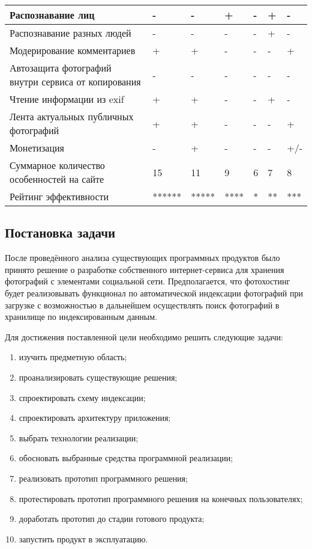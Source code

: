 \begin{landscape}
\begin{table}[H]
\begin{tabular}{|p{5.8cm}|p{2.8cm}|p{2.8cm}|p{2.8cm}|p{2.8cm}|p{2.8cm}|p{2.8cm}|}
  \hline Распознавание лиц & - & - & + & - & + & - \\ 
  \hline Распознавание разных людей & - & - & - & - & + & - \\ 
  \hline Модерирование комментариев & + & + & - & - & - & + \\ 
  \hline Автозащита фотографий внутри сервиса от копирования & - & - & - & - & - & - \\ 
  \hline Чтение информации из exif & + & + & - & - & + & - \\ 
  \hline Лента актуальных публичных фотографий & + & + & - & - & - & + \\ 
  \hline Монетизация & - & + & - & - & - & +/- \\ 
  \hline Суммарное количество особенностей на сайте & 15 & 11 & 9 & 6 & 7 & 8 \\ 
  \hline Рейтинг эффективности & ****** & ***** & **** & * & ** & *** \\
  \hline
  \end{tabular}
\end{table}
\end{landscape}

\subsection{Постановка задачи}\label{problem-formulation}
После проведённого анализа существующих программных продуктов было принято решение о разработке собственного интернет-сервиса для хранения фотографий с элементами социальной сети. 
Предполагается, что фотохостинг будет реализовывать функционал по автоматической индексации фотографий при загрузке с возможностью в дальнейшем осуществлять поиск фотографий в хранилище по индексированным данным.

Для достижения поставленной цели необходимо решить следующие задачи:
\begin{enumerate}
    \item изучить предметную область;
    \item проанализировать существующие решения;
    \item спроектировать схему индексации;
    \item спроектировать архитектуру приложения;
    \item выбрать технологии реализации;
    \item обосновать выбранные средства программной реализации;
    \item реализовать прототип программного решения;
    \item протестировать прототип программного решения на конечных пользователях;
    \item доработать прототип до стадии готового продукта;
    \item запустить продукт в эксплуатацию.
\end{enumerate}

